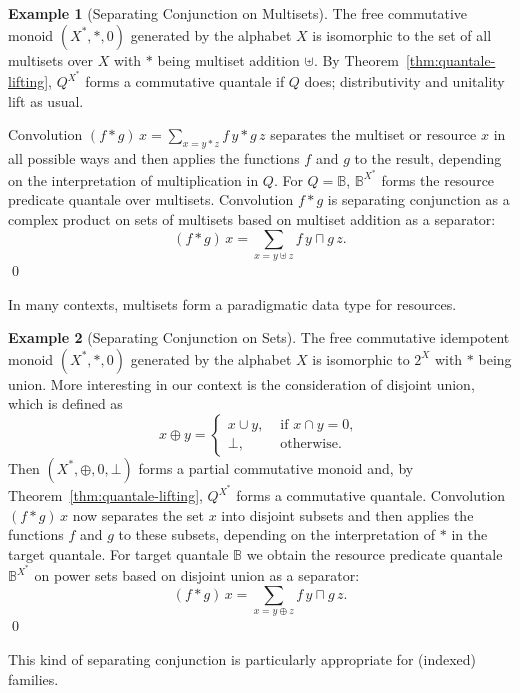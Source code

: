 \documentclass[12pt]{article}
\newcommand{\Al}{X}
\theoremstyle{definition}
\newtheorem{example}{Example}
\begin{document}
\begin{example}[Separating Conjunction on Multisets]\label{ex:separating-conjunction-ms}
  The free commutative monoid $(\Al^\ast,\ast,0)$ generated by the
  alphabet $\Al$ is isomorphic to the set of all multisets over $\Al$
  with $\ast$ being multiset addition $\uplus$. By
  Theorem~\ref{thm:quantale-lifting}, $Q^{\Al^\ast}$ forms a
  commutative quantale if $Q$ does; distributivity and unitality lift
  as usual.

  Convolution $ (f\ast g)\, x =\sum_{x=y\ast z}f\, y\ast g\, z$ separates
  the multiset or resource $x$ in all possible ways and then applies
  the functions $f$ and $g$ to the result, depending on the
  interpretation of multiplication in $Q$. For $Q=\mathbb{B}$,
  $\mathbb{B}^{\Al^\ast}$ forms the resource predicate quantale over
  multisets. Convolution $f\ast g$ is separating conjunction as a
  complex product on sets
  of multisets based on multiset addition as a separator:
  \begin{equation*}
    (f\ast g)\, x =\sum_{x=y\uplus z} f\, y\sqcap g\, z.
  \end{equation*}
  \qed
\end{example}
In many contexts, multisets form a paradigmatic data type for resources.

\begin{example}[Separating Conjunction on Sets]\label{ex:separating-conjunction-sets}
  The free commutative idempotent monoid $(\Al^\ast,\ast,0)$ generated
  by the alphabet $\Al$ is isomorphic to $2^\Al$ with $\ast$ being
  union. More interesting in our context is the consideration of
  disjoint union, which is defined as
  \begin{equation*}
    x\oplus y =
    \begin{cases}
      x\cup y, & \text{ if } x\cap y=0,\\
      \bot, & \text{ otherwise}.
    \end{cases}
  \end{equation*}
  Then $(\Al^\ast,\oplus,0,\bot)$ forms a partial commutative monoid
  and, by Theorem~\ref{thm:quantale-lifting}, $Q^{\Al^\ast}$ forms a
  commutative quantale.  Convolution $(f\ast g)\, x$ now separates the
  set $x$ into disjoint subsets and then applies the functions $f$ and
  $g$ to these subsets, depending on the interpretation of $\ast$ in
  the target quantale.  For target quantale $\mathbb{B}$ we obtain the
  resource predicate quantale $\mathbb{B}^{\Al^\ast}$ on power sets
  based on disjoint union as a separator:
  \begin{equation*}
    (f\ast g)\, x =\sum_{x=y\oplus z} f\, y\sqcap g\, z.
  \end{equation*}
\qed
\end{example}
This kind of separating conjunction is particularly appropriate for
(indexed) families.
\end{document}
